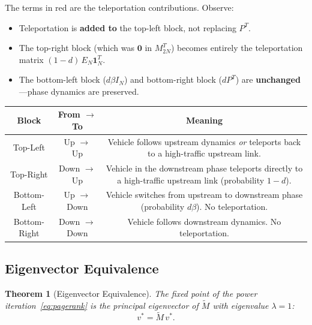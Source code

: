 \documentclass[12pt,a4paper]{article}
\theoremstyle{definition}
\theoremstyle{plain}
\newtheorem{theorem}{Theorem}[section]
\begin{document}
The terms in {\color{accent}red} are the teleportation contributions. Observe:
\begin{itemize}
  \item Teleportation is \textbf{added to} the top-left block, not replacing $P^T$.
  \item The top-right block (which was $\bm{0}$ in $M_{2N}^T$) becomes entirely the
    teleportation matrix $(1-d)\,E_N\bm{1}_N^T$.
  \item The bottom-left block ($d\beta I_N$) and bottom-right block ($dP^T$) are
    \textbf{unchanged}---phase dynamics are preserved.
\end{itemize}

\begin{center}
\renewcommand{\arraystretch}{1.4}
\begin{tabular}{|c|c|c|}
\hline
\textbf{Block} & \textbf{From $\to$ To} & \textbf{Meaning} \\
\hline
Top-Left & Up $\to$ Up &
\begin{minipage}{6.5cm}\small
  Vehicle follows upstream dynamics \emph{or} teleports back to a
  high-traffic upstream link.
\end{minipage} \\
\hline
Top-Right & Down $\to$ Up &
\begin{minipage}{6.5cm}\small
  Vehicle in the downstream phase teleports directly to a high-traffic
  upstream link (probability $1-d$).
\end{minipage} \\
\hline
Bottom-Left & Up $\to$ Down &
\begin{minipage}{6.5cm}\small
  Vehicle switches from upstream to downstream phase (probability
  $d\beta$). No teleportation.
\end{minipage} \\
\hline
Bottom-Right & Down $\to$ Down &
\begin{minipage}{6.5cm}\small
  Vehicle follows downstream dynamics. No teleportation.
\end{minipage} \\
\hline
\end{tabular}
\end{center}

\subsection{Eigenvector Equivalence}

\begin{theorem}[Eigenvector Equivalence]
  \label{thm:equiv}
  The fixed point of the power iteration~\eqref{eq:pagerank} is the principal eigenvector
  of $\widetilde{M}$ with eigenvalue $\lambda = 1$:
  \[
    v^* = \widetilde{M}\,v^*.
  \]
\end{theorem}
\end{document}
